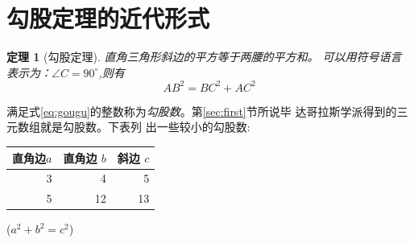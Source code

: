 \documentclass[UTF8]{ctexart}
\newtheorem{thm}{定理}
\begin{document}
\section{勾股定理的近代形式}
	\begin{thm}[勾股定理]
		直角三角形斜边的平方等于两腰的平方和。
		可以用符号语言表示为：$\angle C = 90^\circ$,则有
		\begin{equation}\label{eq:gougu}
			AB^2 = BC^2 + AC^2
		\end{equation}
	\end{thm}
	满足式\eqref{eq:gougu}的整数称为\emph{勾股数}。第\ref{sec:first}节所说毕 达哥拉斯学派得到的三元数组就是勾股数。下表列 出一些较小的勾股数:
	\begin{table}[H]
		\begin{tabular}{|rrr|}
			\hline
			直角边$a$ & 直角边 $b$ & 斜边 $c$ \\
			\hline
			3 &  4 &  5  \\
			5 & 12 & 13  \\
			\hline
		\end{tabular}
		\qquad
		($a^2 + b^2 = c^2$)
	\end{table}


\end{document}
